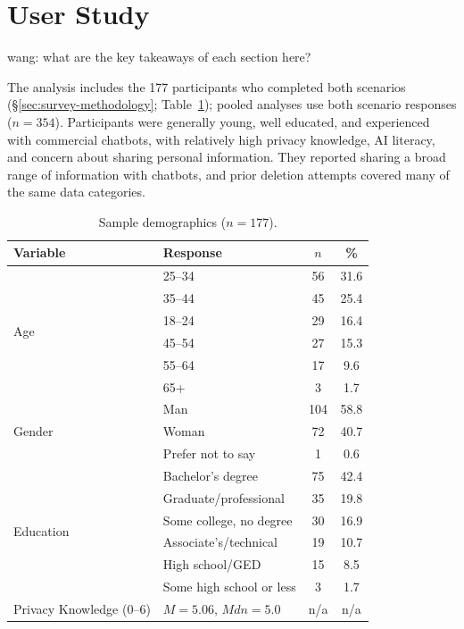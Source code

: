 \documentclass[conference,compsoc]{IEEEtran}
\newcommand{\xw}[1] {{\color{red}wang: #1}}
\begin{document}
\section{User Study}

\xw{what are the key takeaways of each section here?}

\label{sec:sample-knowledge}

The analysis includes the 177 participants who completed both scenarios (\S\ref{sec:survey-methodology}; Table~\ref{tab:demographics}); pooled analyses use both scenario responses ($n=354$). Participants were generally young, well educated, and experienced with commercial chatbots, with relatively high privacy knowledge, AI literacy, and concern about sharing personal information. They reported sharing a broad range of information with chatbots, and prior deletion attempts covered many of the same data categories.

\begin{table}[t]
\centering
\caption{Sample demographics ($n=177$).}
\label{tab:demographics}
\small
\setlength{\tabcolsep}{3.5pt}
\begin{tabular}{llcc}
\toprule
Variable & Response & $n$ & \% \\
\midrule
\multirow{6}{*}{Age}
 & 25--34 & 56 & 31.6 \\
 & 35--44 & 45 & 25.4 \\
 & 18--24 & 29 & 16.4 \\
 & 45--54 & 27 & 15.3 \\
 & 55--64 & 17 & 9.6 \\
 & 65+    & 3  & 1.7 \\
\midrule
\multirow{3}{*}{Gender}
 & Man               & 104 & 58.8 \\
 & Woman             & 72  & 40.7 \\
 & Prefer not to say & 1   & 0.6 \\
\midrule
\multirow{6}{*}{Education}
 & Bachelor's degree      & 75 & 42.4 \\
 & Graduate/professional  & 35 & 19.8 \\
 & Some college, no degree & 30 & 16.9 \\
 & Associate's/technical  & 19 & 10.7 \\
 & High school/GED        & 15 & 8.5 \\
 & Some high school or less & 3 & 1.7 \\
\midrule
Privacy Knowledge (0--6) & $M=5.06$, $Mdn=5.0$ & n/a & n/a \\
\bottomrule
\end{tabular}
\end{table}
\end{document}
